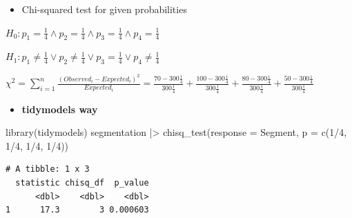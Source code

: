 \documentclass[
  ignorenonframetext,
]{beamer}
\newenvironment{Shaded}{\begin{snugshade}}{\end{snugshade}}
\newcommand{\AttributeTok}[1]{\textcolor[rgb]{0.40,0.45,0.13}{#1}}
\newcommand{\DecValTok}[1]{\textcolor[rgb]{0.68,0.00,0.00}{#1}}
\newcommand{\FunctionTok}[1]{\textcolor[rgb]{0.28,0.35,0.67}{#1}}
\newcommand{\NormalTok}[1]{\textcolor[rgb]{0.00,0.23,0.31}{#1}}
\newcommand{\SpecialCharTok}[1]{\textcolor[rgb]{0.37,0.37,0.37}{#1}}
\providecommand{\tightlist}{%
  \setlength{\itemsep}{0pt}\setlength{\parskip}{0pt}}\usepackage{longtable,booktabs,array}
\begin{document}
\begin{frame}[fragile]{}
\label{section-6}
\begin{itemize}
\tightlist
\item
  Chi-squared test for given probabilities
\end{itemize}

\(H_0: p_1 = \frac{1}{4} \land p_2 = \frac{1}{4} \land p_3 = \frac{1}{4} \land p_4 = \frac{1}{4}\)

\(H_1: p_1 \neq \frac{1}{4} \lor p_2 \neq \frac{1}{4} \lor p_3 = \frac{1}{4} \lor p_4 \neq \frac{1}{4}\)

\(\chi^2 = \sum_{i=1}^n \frac{(Observed_i - Expected_i)^2}{Expected_i} = \frac{70 - 300\frac{1}{4}}{300\frac{1}{4}} + \frac{100 - 300\frac{1}{4}}{300\frac{1}{4}} + \frac{80 - 300\frac{1}{4}}{300\frac{1}{4}} + \frac{50 - 300\frac{1}{4}}{300\frac{1}{4}}\)

\begin{itemize}
\tightlist
\item
  \textbf{tidymodels way}
\end{itemize}

\tiny

\begin{Shaded}
\begin{Highlighting}[]
\FunctionTok{library}\NormalTok{(tidymodels)}
\NormalTok{segmentation }\SpecialCharTok{|\textgreater{}}  
  \FunctionTok{chisq\_test}\NormalTok{(}\AttributeTok{response =}\NormalTok{ Segment,}
             \AttributeTok{p =} \FunctionTok{c}\NormalTok{(}\DecValTok{1}\SpecialCharTok{/}\DecValTok{4}\NormalTok{, }\DecValTok{1}\SpecialCharTok{/}\DecValTok{4}\NormalTok{, }\DecValTok{1}\SpecialCharTok{/}\DecValTok{4}\NormalTok{, }\DecValTok{1}\SpecialCharTok{/}\DecValTok{4}\NormalTok{))}
\end{Highlighting}
\end{Shaded}

\begin{verbatim}
# A tibble: 1 x 3
  statistic chisq_df  p_value
      <dbl>    <dbl>    <dbl>
1      17.3        3 0.000603
\end{verbatim}
\end{frame}
\end{document}
